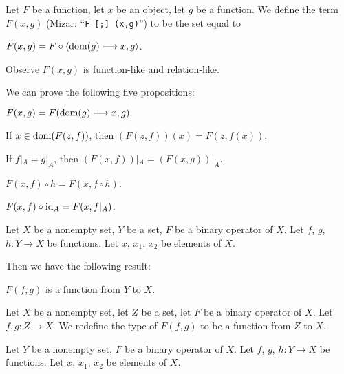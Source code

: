 \documentclass{article}
\begin{document}
\begin{definition}%
Let $F$ be a function, let $x$ be an object, let $g$ be a function.
We define the term $F(x,g)$ (Mizar: ``\verb#F [;] (x,g)#'') to be the set equal to
\begin{defn}
\item\label{funcop1:def5}%
$F(x,g)=F\circ\langle\operatorname{dom}(g)\longmapsto x,g\rangle$.
\end{defn}
\end{definition}

Observe $F(x,g)$ is function-like and relation-like.

We can prove the following five propositions:
\begin{thm}
\item\label{funcop1:31} $F(x,g)=F(\operatorname{dom}(g)\longmapsto x,g)$
\item\label{funcop1:32} If $x\in\operatorname{dom}(F(z,f))$, then $(F(z,f))(x)=F(z,f(x))$.
\item\label{funcop1:33} If $f|_{A}=g|_{A}$,
  then $(F(x,f))|_{A}=(F(x,g))|_{A}$.
\item\label{funcop1:34} $F(x,f)\circ h=F(x,f\circ h)$.
\item\label{funcop1:35} $F(x,f)\circ\operatorname{id}_{A}=F(x,f|_{A})$.
\end{thm}

Let $X$ be a nonempty set, $Y$ be a set, $F$ be a binary operator of $X$.
Let $f$, $g$, $h\colon Y\to X$ be functions. Let $x$, $x_{1}$, $x_{2}$
be elements of $X$.

Then we have the following result:
\begin{thm}
\item\label{funcop1:36} $F(f,g)$ is a function from $Y$ to $X$.
\end{thm}

\begin{definition}
Let $X$ be a nonempty set, let $Z$ be a set, let $F$ be a binary
operator of $X$. Let $f,g\colon Z\to X$.
We redefine the type of $F(f,g)$ to be a function from $Z$ to $X$.
\end{definition}

Let $Y$ be a nonempty set, $F$ be a binary operator of $X$.
Let $f$, $g$, $h\colon Y\to X$ be functions. Let $x$, $x_{1}$, $x_{2}$
be elements of $X$.
\end{document}
